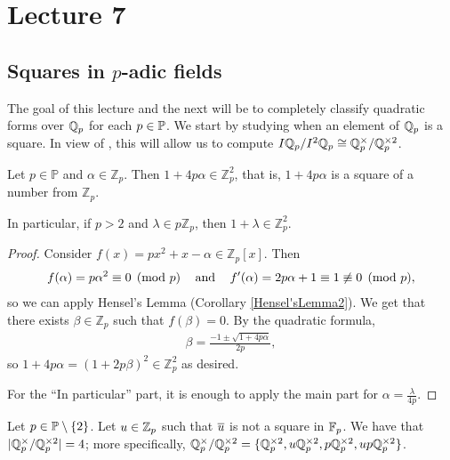 \documentclass[12pt, leqno, british]{amsart}
\author{Nicolas Daans}
\begin{document}
\section{Lecture 7}

\subsection{Squares in $p$-adic fields}
The goal of this lecture and the next will be to completely classify quadratic forms over $\mathbb Q_p$ for each $p \in \mathbb{P}$.
We start by studying when an element of $\mathbb Q_p$ is a square.
In view of , this will allow us to compute $I\mathbb Q_p/I^2\mathbb Q_p \cong \mathbb Q_p^{\times}/\mathbb Q_p^{\times 2}$.

\begin{prop}\label{LocalSquareThm}
Let $p\in\mathbb{P}$ and $\alpha\in\mathbb{Z}_{p}$. Then $1+4p\alpha\in\mathbb{Z}_{p}^{2}$, that is, $1+4p\alpha$ is a square of a number from $\mathbb{Z}_{p}$.

In particular, if $p>2$ and $\lambda\in p\mathbb{Z}_{p}$, then $1+\lambda\in\mathbb{Z}_{p}^{2}$.
\end{prop}
\begin{proof}
Consider $f(x)=px^{2} + x - \alpha\in\mathbb{Z}_{p}[x]$. Then
\begin{align*}
f(\alpha ) = p\alpha^{2} \equiv 0 \pmod{p} \hspace{0.3cm} \textrm{ and } \hspace{0.3cm} f'(\alpha ) =2p\alpha + 1\equiv 1\not\equiv 0 \pmod{p},
\end{align*}
so we can apply Hensel's Lemma (Corollary \ref{Hensel'sLemma2}). We get that there exists $\beta\in\mathbb{Z}_{p}$ such that $f(\beta )=0$. By the quadratic formula, 
\begin{align*}
\beta = \frac{-1 \pm \sqrt{1+4p\alpha}}{2p},
\end{align*}
so $1+4p\alpha = (1+2p\beta )^{2} \in\mathbb{Z}_{p}^{2}$ as desired.

For the ``In particular'' part, it is enough to apply the main part for $\alpha =\frac{\lambda}{4p}$.
\end{proof}
\begin{cor}\label{C:qqp-squares-odd}
Let $p \in \mathbb P \setminus \lbrace 2 \rbrace$.
Let $u \in \mathbb Z_p$ such that $\overline u$ is not a square in $\mathbb F_p$.
We have that $\lvert \mathbb Q_p^\times / \mathbb Q_p^{\times 2}\rvert = 4$; more specifically, $\mathbb Q_p^\times / \mathbb Q_p^{\times 2} = \lbrace \mathbb Q_p^{\times 2}, u\mathbb Q_p^{\times 2}, p\mathbb Q_p^{\times 2}, up\mathbb Q_p^{\times 2} \rbrace$.
\end{cor}
\end{document}
